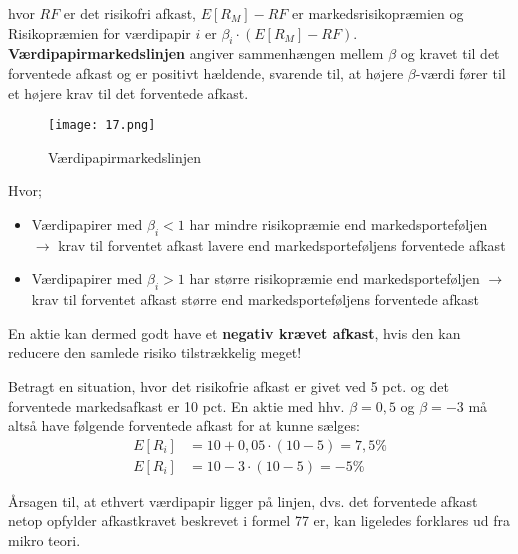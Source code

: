 \documentclass[10pt,reqno, usenames]{article}
\begin{document}
hvor $RF$ er det risikofri afkast, $E[R_M] - RF$ er markedsrisikopræmien og Risikopræmien for værdipapir $i$ er $\beta_i \cdot (E[R_M] - RF)$. \textbf{Værdipapirmarkedslinjen} angiver sammenhængen mellem $\beta$ og kravet til det forventede afkast og er positivt hældende, svarende til, at højere $\beta$-værdi fører til et højere krav til det forventede afkast. 

\begin{figure}[h]
     \centering
     \texttt{[image: 17.png]}
     \caption{Værdipapirmarkedslinjen}
     \label{Figur 2}
\end{figure} 

\newpage

Hvor; 

\begin{itemize}
    \item Værdipapirer med \( \beta_i < 1 \) har mindre risikopræmie end markedsporteføljen $\rightarrow$ krav til forventet afkast lavere end markedsporteføljens forventede afkast
    \item Værdipapirer med \( \beta_i > 1 \) har større risikopræmie end markedsporteføljen $\rightarrow$ krav til forventet afkast større end markedsporteføljens forventede afkast
\end{itemize}

En aktie kan dermed godt have et \textbf{negativ krævet afkast}, hvis den kan reducere den samlede risiko tilstrækkelig meget! 

\vspace{10 pt}

Betragt en situation, hvor det risikofrie afkast er givet ved 5 pct. og det forventede markedsafkast er 10 pct. En aktie med hhv. $\beta = 0,5$ og $\beta = -3$  må altså have følgende forventede afkast for at kunne sælges: 
\begin{align*}
    E[R_i] &= 10 + 0,05 \cdot (10-5) = 7,5 \% \\
    E[R_i] &= 10 -3 \cdot (10-5) = -5 \% 
\end{align*}

Årsagen til, at ethvert værdipapir ligger på linjen, dvs. det forventede afkast netop opfylder afkastkravet beskrevet i formel 77 er, kan ligeledes forklares ud fra mikro teori. 
\end{document}
